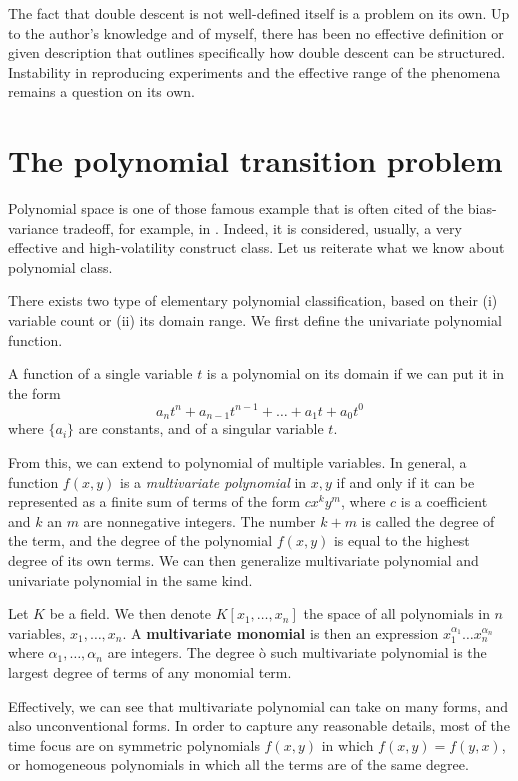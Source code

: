 \documentclass[10pt]{article} %
\begin{document}
The fact that double descent is not well-defined itself is a problem on its own. Up to the author's knowledge and of myself, there has been no effective definition or given description that outlines specifically how double descent can be structured. Instability in reproducing experiments and the effective range of the phenomena remains a question on its own. 

\section{The polynomial transition problem}

Polynomial space is one of those famous example that is often cited of the bias-variance tradeoff, for example, in \cite{goodfellow2016deep,10.5555/2930837}. Indeed, it is considered, usually, a very effective and high-volatility construct class. Let us reiterate what we know about polynomial class. 

There exists two type of elementary polynomial classification, based on their (i) variable count or (ii) its domain range. We first define the univariate polynomial function.

\begin{definition}
    A function of a single variable $t$ is a polynomial on its domain if we can put it in the form 
    \begin{equation}
        a_{n}t^{n} + a_{n-1}t^{n-1} + \dots + a_{1}t + a_{0}t^{0}
    \end{equation}
    where $\{a_{i}\}$ are constants, and of a singular variable $t$.  
\end{definition}

From this, we can extend to polynomial of multiple variables. In general, a function $f(x,y)$ is a \textit{multivariate polynomial} in $x,y$ if and only if it can be represented as a finite sum of terms of the form $cx^{k}y^{m}$, where $c$ is a coefficient and $k$ an $m$ are nonnegative integers. The number $k+m$ is called the degree of the term, and the degree of the polynomial $f(x,y)$ is equal to the highest degree of its own terms. We can then generalize multivariate polynomial and univariate polynomial in the same kind. 

\begin{definition}
    Let $K$ be a field. We then denote $K[x_{1},\dots,x_{n}]$ the space of all polynomials in $n$ variables, $x_{1},\dots,x_{n}$. A \textbf{multivariate monomial} is then an expression $x_{1}^{\alpha_{1}}\dots x_{n}^{\alpha_{n}}$ where $\alpha_{1},\dots,\alpha_{n}$ are integers. The degree ò such multivariate polynomial is the largest degree of terms of any monomial term.
\end{definition}
Effectively, we can see that multivariate polynomial can take on many forms, and also unconventional forms. In order to capture any reasonable details, most of the time focus are on symmetric polynomials $f(x,y)$ in which $f(x,y)=f(y,x)$, or homogeneous polynomials in which all the terms are of the same degree. 
\end{document}
